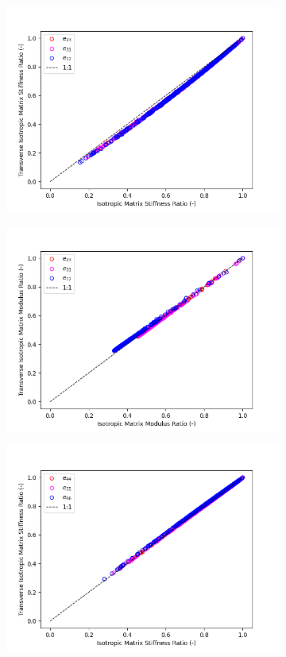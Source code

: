 \documentclass[a4paper,fleqn]{DC_ArtStyle}
\begin{document}
\begin{figure}
\begin{subfigure}[b]{0.45\linewidth}
			\includegraphics[width=\linewidth]{LambdaijStiffness_Ratios}
		\end{subfigure}
		\begin{subfigure}[b]{0.45\linewidth}
			\includegraphics[width=\linewidth]{LambdaijModulus_Ratios}
		\end{subfigure}
		\begin{subfigure}[b]{0.45\linewidth}
			\includegraphics[width=\linewidth]{MuijStiffness_Ratios}

\end{subfigure}
\end{figure}
\end{document}
